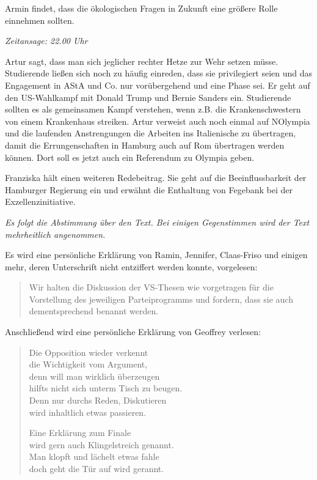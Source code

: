 \documentclass[ngerman,headheight=70pt]{scrartcl}
\begin{document}
    Armin findet, dass die ökologischen Fragen in Zukunft eine größere Rolle
    einnehmen sollten.

    \textit{Zeitansage: 22.00 Uhr}

    Artur sagt, dass man sich jeglicher rechter Hetze zur Wehr setzen müsse.
    Studierende ließen sich noch zu häufig einreden, dass sie privilegiert
    seien und das Engagement in AStA und Co. nur vorübergehend und eine Phase
    sei. Er geht auf den US-Wahlkampf mit Donald Trump und Bernie Sanders ein.
    Studierende sollten es als gemeinsamen Kampf verstehen, wenn z.B. die
    Krankenschwestern von einem Krankenhaus streiken.
    Artur verweist auch noch einmal auf NOlympia und die laufenden Anstrengungen
    die Arbeiten ins Italienische zu übertragen, damit die Errungenschaften
    in Hamburg auch auf Rom übertragen werden können. Dort soll es jetzt auch
    ein Referendum zu Olympia geben.

    Franziska hält einen weiteren Redebeitrag. Sie geht auf die Beeinflussbarkeit
    der Hamburger Regierung ein und erwähnt die Enthaltung von Fegebank
    bei der Exzellenzinitiative.

    \textit{Es folgt die Abstimmung über den Text. Bei einigen Gegenstimmen wird
    der Text mehrheitlich angenommen.}

    Es wird eine persönliche Erklärung von Ramin, Jennifer, Claas-Friso
    und einigen mehr, deren Unterschrift nicht entziffert werden konnte, vorgelesen:

    \blockquote{Wir halten die Diskussion der VS-Thesen wie vorgetragen für die
    Vorstellung des jeweiligen Parteiprogramms und fordern, dass sie auch dementsprechend
    benannt werden.}

    Anschließend wird eine persönliche Erklärung von Geoffrey verlesen:
    \blockquote{Die Opposition wieder verkennt\\
    die Wichtigkeit vom Argument,\\
    denn will man wirklich überzeugen\\
    hilfts nicht sich unterm Tisch zu beugen.\\
    Denn nur durchs Reden, Diskutieren\\
    wird inhaltlich etwas passieren.

    Eine Erklärung zum Finale\\
    wird gern auch Klingelstreich genannt.\\
    Man klopft und lächelt etwas fahle\\
    doch geht die Tür auf wird gerannt.}
\end{document}
